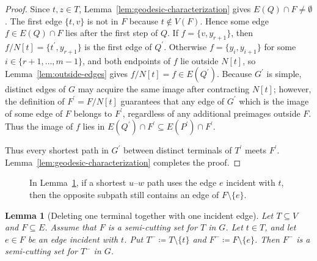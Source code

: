 \documentclass[11pt,a4paper]{amsart}
\theoremstyle{definition}
\theoremstyle{plain}
\newtheorem{lemma}[definition]{Lemma}
\begin{document}
\begin{proof}
Since $t,z\in T$, Lemma~\ref{lem:geodesic-characterization} gives $E(Q)\cap F\neq\emptyset$. The first edge $\{t,v\}$ is not in $F$ because $t\notin V(F)$. Hence some edge $f\in E(Q)\cap F$ lies after the first step of $Q$. If $f=\{v,y_{r+1}\}$, then $f/N[t]=\{t^\prime,y_{r+1}\}$ is the first edge of $Q^\prime$. Otherwise $f=\{y_i,y_{i+1}\}$ for some $i\in\{r+1,\dots,m-1\}$, and both endpoints of $f$ lie outside $N[t]$, so Lemma~\ref{lem:outside-edges} gives $f/N[t]=f\in E(Q^\prime)$. Because $G^\prime$ is simple, distinct edges of $G$ may acquire the same image after contracting $N[t]$; however, the definition of $F^\prime=F/N[t]$ guarantees that any edge of $G^\prime$ which is the image of some edge of $F$ belongs to $F^\prime$, regardless of any additional preimages outside $F$. Thus the image of $f$ lies in $E(Q^\prime)\cap F^\prime\subseteq E(P^\prime)\cap F^\prime$.

Thus every shortest path in $G^\prime$ between distinct terminals of $T^\prime$ meets $F^\prime$. Lemma~\ref{lem:geodesic-characterization} completes the proof.
\end{proof}

\begin{figure}[t]
\centering
{}
\caption{In Lemma~\ref{lem:terminal-deletion}, if a shortest $u$--$w$ path uses the edge $e$ incident with $t$, then the opposite subpath still contains an edge of $F\setminus\{e\}$.}
\label{fig:split-path}
\end{figure}

\begin{lemma}[Deleting one terminal together with one incident edge]\label{lem:terminal-deletion}
Let $T\subseteq V$ and $F\subseteq E$. Assume that $F$ is a semi-cutting set for $T$ in $G$. Let $t\in T$, and let $e\in F$ be an edge incident with $t$. Put $T^-\coloneqq T\setminus\{t\}$ and $F^-\coloneqq F\setminus\{e\}$. Then $F^-$ is a semi-cutting set for $T^-$ in $G$.
\end{lemma}
\end{document}
